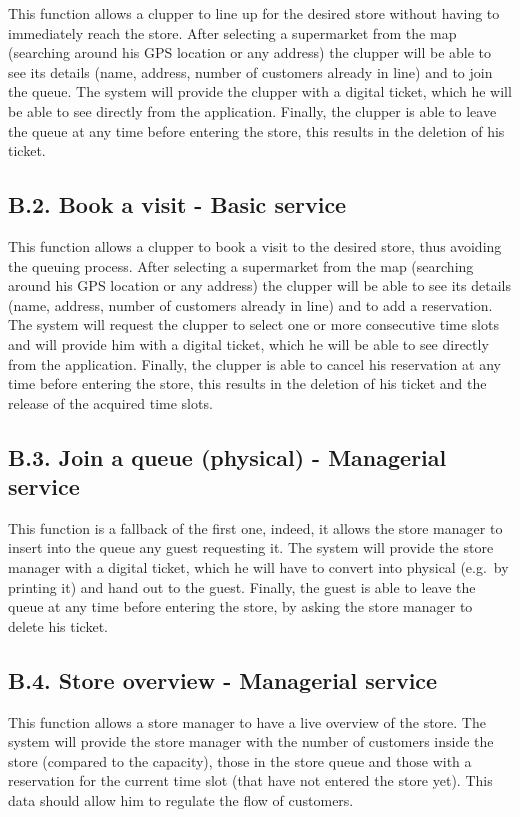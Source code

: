 This function allows a clupper to line up for the desired store without having to immediately reach the store. After selecting a supermarket from the map (searching around his GPS location or any address) the clupper will be able to see its details (name, address, number of customers already in line) and to join the queue. The system will provide the clupper with a digital ticket, which he will be able to see directly from the application. Finally, the clupper is able to leave the queue at any time before entering the store, this results in the deletion of his ticket.

\subsection{B.2. Book a visit - Basic service}

This function allows a clupper to book a visit to the desired store, thus avoiding the queuing process. After selecting a supermarket from the map (searching around his GPS location or any address) the clupper will be able to see its details (name, address, number of customers already in line) and to add a reservation. The system will request the clupper to select one or more consecutive time slots and will provide him with a digital ticket, which he will be able to see directly from the application. Finally, the clupper is able to cancel his reservation at any time before entering the store, this results in the deletion of his ticket and the release of the acquired time slots.

\subsection{B.3. Join a queue (physical) - Managerial service}

This function is a fallback of the first one, indeed, it allows the store manager to insert into the queue any guest requesting it. The system will provide the store manager with a digital ticket, which he will have to convert into physical (e.g.~by printing it) and hand out to the guest. Finally, the guest is able to leave the queue at any time before entering the store, by asking the store manager to delete his ticket.

\subsection{B.4. Store overview - Managerial service}

This function allows a store manager to have a live overview of the store. The system will provide the store manager with the number of customers inside the store (compared to the capacity), those in the store queue and those with a reservation for the current time slot (that have not entered the store yet). This data should allow him to regulate the flow of customers.


